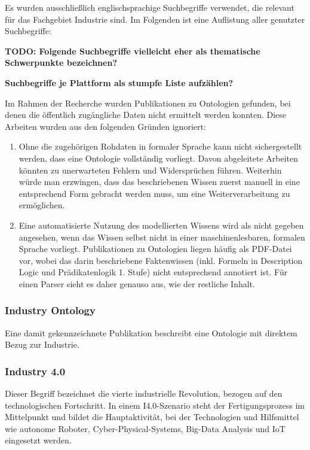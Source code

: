 \documentclass{article}
\begin{document}
Es wurden ausschließlich englischsprachige Suchbegriffe verwendet, die relevant für das Fachgebiet Industrie sind.
Im Folgenden ist eine Auflistung aller genutzter Suchbegriffe:

\textbf{TODO: Folgende Suchbegriffe vielleicht eher als thematische Schwerpunkte bezeichnen?}

\textbf{Suchbegriffe je Plattform als stumpfe Liste aufzählen?}

Im Rahmen der Recherche wurden Publikationen zu Ontologien gefunden, bei denen die öffentlich zugängliche Daten nicht ermittelt werden konnten.
Diese Arbeiten wurden aus den folgenden Gründen ignoriert:
\begin{enumerate}
    \item Ohne die zugehörigen Rohdaten in formaler Sprache kann nicht sichergestellt werden, dass eine Ontologie vollständig vorliegt. Davon abgeleitete Arbeiten könnten zu unerwarteten Fehlern und Widersprüchen führen. Weiterhin würde man erzwingen, dass das beschriebenen Wissen zuerst manuell in eine entsprechend Form gebracht werden muss, um eine Weiterverarbeitung zu ermöglichen.
    \item Eine automatisierte Nutzung des modellierten Wissens wird als nicht gegeben angesehen, wenn das Wissen selbst nicht in einer maschinenlesbaren, formalen Sprache vorliegt. Publikationen zu Ontologien liegen häufig als PDF-Datei vor, wobei das darin beschriebene Faktenwissen (inkl. Formeln in Description Logic und Prädikatenlogik 1. Stufe) nicht entsprechend annotiert ist. Für einen Parser sieht es daher genauso aus, wie der restliche Inhalt.
\end{enumerate}

\subsubsection{Industry Ontology}

Eine damit gekennzeichnete Publikation beschreibt eine Ontologie mit direktem Bezug zur Industrie.

\subsubsection{Industry 4.0}

Dieser Begriff bezeichnet die vierte industrielle Revolution, bezogen auf den technologischen Fortschritt. In einem I4.0-Szenario steht der Fertigungsprozess im Mittelpunkt und bildet die Hauptaktivität, bei der Technologien und Hilfsmittel wie autonome Roboter, Cyber-Physical-Systems, Big-Data Analysis und IoT eingesetzt werden.
\end{document}
